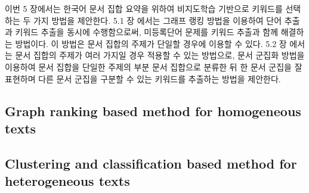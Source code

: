 \documentclass[11pt]{article}
\begin{document}
이번 5 장에서는 한국어 문서 집합 요약을 위하여 비지도학습 기반으로 키워드를 선택하는 두 가지 방법을 제안한다.
5.1 장 에서는 그래프 랭킹 방법을 이용하여 단어 추출과 키워드 추출을 동시에 수행함으로써, 미등록단어 문제를 키워드 추출과 함께 해결하는 방법이다.
이 방법은 문서 집합의 주제가 단일할 경우에 이용할 수 있다.
5.2 장 에서는 문서 집합의 주제가 여러 가지일 경우 적용할 수 있는 방법으로, 문서 군집화 방법을 이용하여 문서 집합을 단일한 주제의 부분 문서 집합으로 분류한 뒤 한 문서 군집을 잘 표현하며 다른 문서 군집을 구분할 수 있는 키워드를 추출하는 방법을 제안한다.

\subsection{Graph ranking based method for homogeneous texts}



\subsection{Clustering and classification based method for heterogeneous texts}




\end{document}
